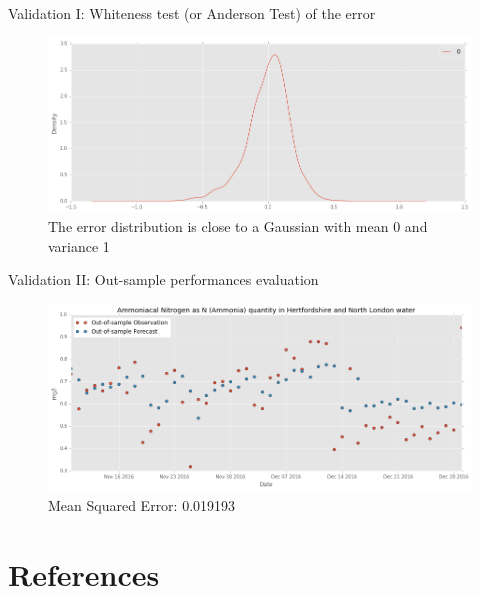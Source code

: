 \documentclass[british]{beamer}
\begin{document}
\begin{frame}{Validation I: Whiteness test (or Anderson Test) of the error}
	\begin{figure}
		\includegraphics[width=\linewidth]{./Imgs/whiteness.png}
		\caption{The error distribution is close to a Gaussian with mean 0 and variance 1}
	\end{figure}
\end{frame}

\begin{frame}{Validation II: Out-sample performances evaluation}
		\begin{figure}
			\includegraphics[width=\linewidth]{./Imgs/validation.png}
			\caption{Mean Squared Error: 0.019193}
		\end{figure}
\end{frame}
		
\section{References}
\end{document}
